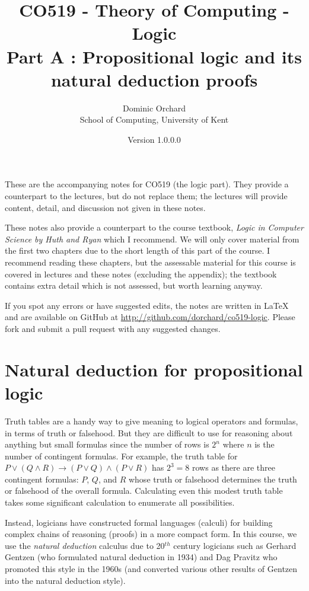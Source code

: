 \documentclass{article}
\title{\vspace{-3em}CO519 - Theory of Computing - Logic \\
  {\large{Part A : Propositional logic and its natural deduction
      proofs}}}
\author{Dominic Orchard \\
  {\small{School of Computing, University of Kent}}}
\date{Version 1.0.0.0}
\theoremstyle{definition}
\begin{document}
\maketitle

These are the accompanying notes for CO519 (the logic part). They provide
a counterpart to the lectures, but do not replace them; the lectures
will provide content, detail, and discussion not given in these notes.

These notes also provide a counterpart to the course textbook,
\emph{Logic in Computer Science by Huth and Ryan} which I 
recommend. We will only cover material from the first two chapters due
to the short length of this part of the course. I recommend reading
these chapters, but the assessable material for this course is
covered in lectures and these notes (excluding the appendix); the
textbook contains extra detail which is not assessed, but
worth learning anyway.

If you spot any errors or have suggested edits, the notes are written
in LaTeX and are available on GitHub at
\url{http://github.com/dorchard/co519-logic}. Please fork and submit a
pull request with any suggested changes.

\section{Natural deduction for propositional logic}

Truth tables are a handy way to give meaning to logical operators and
formulas, in terms of truth or falsehood. But they are difficult to
use for reasoning about anything but small formulas since the number
of rows is $2^n$ where $n$ is the number of contingent
formulas. For example, the truth table for
$P \vee (Q \wedge R) \rightarrow (P \vee Q) \wedge (P \vee R)$ has
$2^3 = 8$ rows as there are three contingent formulas: $P$, $Q$, and
$R$ whose truth or falsehood determines the truth or falsehood of the
overall formula. Calculating even this modest truth table takes some
significant calculation to enumerate all possibilities.

Instead, logicians have constructed formal languages (calculi) for
building complex chains of reasoning (proofs) in a more
compact form. In this course, we use the \emph{natural deduction} calculus
due to 20$^{th}$ century logicians such as Gerhard Gentzen
(who formulated natural deduction in 1934) and Dag Pravitz who 
promoted this style in the 1960s (and converted 
various other results of Gentzen into the natural deduction style).
\end{document}
